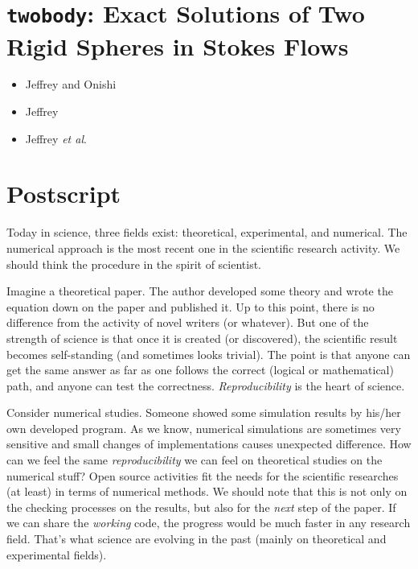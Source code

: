 \documentclass{book}
\begin{document}
\chapter{{\tt twobody}:
  Exact Solutions of Two Rigid Spheres in Stokes Flows}
\label{chp:twobody}

\begin{itemize}
\item Jeffrey and Onishi\cite{JeffreyOnishi1984}
\item Jeffrey\cite{jeffrey1992}
\item Jeffrey {\it et al}.\cite{jeffrey1993}
\end{itemize}



\chapter{Postscript}
Today in science, three fields exist:
theoretical, experimental, and numerical.
The numerical approach is the most recent one
in the scientific research activity.
We should think the procedure in the spirit of scientist.

Imagine a theoretical paper. The author developed some 
theory and wrote the equation down on the paper and published it.
Up to this point, there is no difference from
the activity of novel writers (or whatever).
But one of the strength of science is that
once it is created (or discovered),
the scientific result becomes self-standing
(and sometimes looks trivial).
The point is that anyone can get the same answer
as far as one follows the correct (logical or mathematical)
path, and anyone can test the correctness.
{\it Reproducibility} is the heart of science.


Consider numerical studies.
Someone showed some simulation results by his/her own
developed program. As we know, numerical simulations
are sometimes very sensitive and small changes of 
implementations causes unexpected difference.
How can we feel the same {\it reproducibility}
we can feel on theoretical studies on the numerical stuff?
%
Open source activities fit the needs for the scientific
researches (at least) in terms of numerical methods.
%
We should note that this is not only on the checking processes
on the results, but also for the {\it next} step of the paper.
If we can share the {\it working} code, the progress would
be much faster in any research field. That's what science 
are evolving in the past (mainly on theoretical and 
experimental fields).
\end{document}

